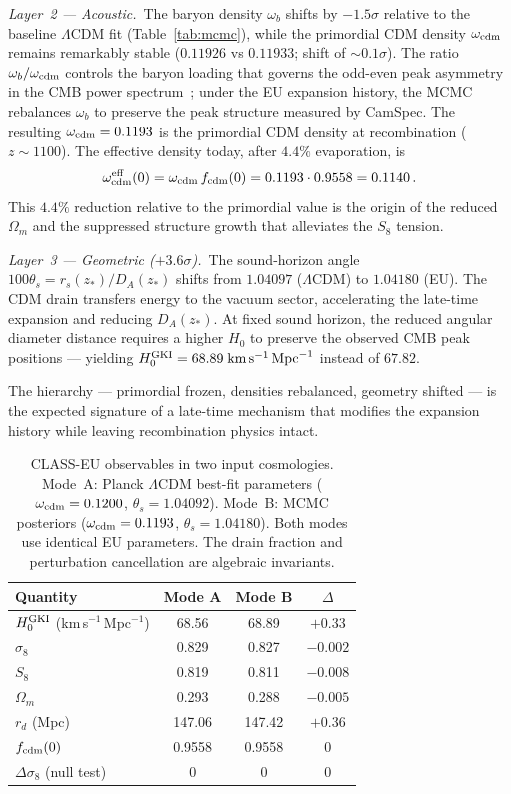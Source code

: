 \documentclass[a4paper,fleqn]{cas-dc}
\begin{document}
\textit{Layer~2 --- Acoustic.}~The baryon density
$\omega_b$ shifts by $-1.5\sigma$ relative to the
baseline $\Lambda$CDM fit (Table~\ref{tab:mcmc}), while
the primordial CDM density $\omega_{\rm cdm}$ remains
remarkably stable ($0.11926$ vs $0.11933$; shift of
$\sim 0.1\sigma$). The ratio
$\omega_b / \omega_{\rm cdm}$ controls the baryon
loading that governs the odd-even peak asymmetry in the
CMB power spectrum~\cite{hu_dodelson2002}; under the EU
expansion history, the MCMC rebalances $\omega_b$ to
preserve the peak structure measured by CamSpec.
The resulting $\omega_{\rm cdm} = 0.1193$ is the
primordial CDM density at recombination
($z \sim 1100$). The effective density today, after
$4.4\%$ evaporation, is
\begin{equation}
\omega_{\rm cdm}^{\rm eff}(0) =
  \omega_{\rm cdm}\, f_{\rm cdm}(0)
  = 0.1193 \cdot 0.9558 = 0.1140\,.
\label{eq:omega_eff}
\end{equation}
This $4.4\%$ reduction relative to the primordial
value is the origin of the reduced $\Omega_m$ and the
suppressed structure growth that alleviates the $S_8$
tension.

\textit{Layer~3 --- Geometric ($+3.6\sigma$).}~The
sound-horizon angle
$100\theta_s = r_s(z_*) / D_A(z_*)$ shifts from
$1.04097$ ($\Lambda$CDM) to $1.04180$ (EU). The CDM drain
transfers energy to the vacuum sector, accelerating the
late-time expansion and reducing $D_A(z_*)$. At fixed
sound horizon, the reduced angular diameter distance
requires a higher $H_0$ to preserve the observed CMB
peak positions --- yielding
$H_0^{\rm GKI} = 68.89\;\text{km}\,\text{s}^{-1}\,\text{Mpc}^{-1}$ instead of
$67.82$.

The hierarchy --- primordial frozen, densities rebalanced,
geometry shifted --- is the expected signature of a
late-time mechanism that modifies the expansion history
while leaving recombination physics intact.
\begin{table}[h!]
\caption{CLASS-EU observables in two input cosmologies.
Mode~A: Planck $\Lambda$CDM best-fit parameters
($\omega_{\rm cdm} = 0.1200$, $\theta_s = 1.04092$).
Mode~B: MCMC posteriors
($\omega_{\rm cdm} = 0.1193$, $\theta_s = 1.04180$).
Both modes use identical EU parameters. The drain fraction
and perturbation cancellation are algebraic invariants.}
\label{tab:mode_ab}
\begin{tabular}{lccc}
Quantity & Mode A & Mode B & $\Delta$ \\
\hline
$H_0^{\rm GKI}$ (km\,s$^{-1}$\,Mpc$^{-1}$) & 68.56 & 68.89 & $+0.33$ \\
$\sigma_8$ & 0.829 & 0.827 & $-0.002$ \\
$S_8$ & 0.819 & 0.811 & $-0.008$ \\
$\Omega_m$ & 0.293 & 0.288 & $-0.005$ \\
$r_d$ (Mpc) & 147.06 & 147.42 & $+0.36$ \\
\hline
$f_{\rm cdm}(0)$ & 0.9558 & 0.9558 & $0$ \\
$\Delta\sigma_8$ (null test) & 0 & 0 & $0$ \\
\end{tabular}
\end{table}
\end{document}
